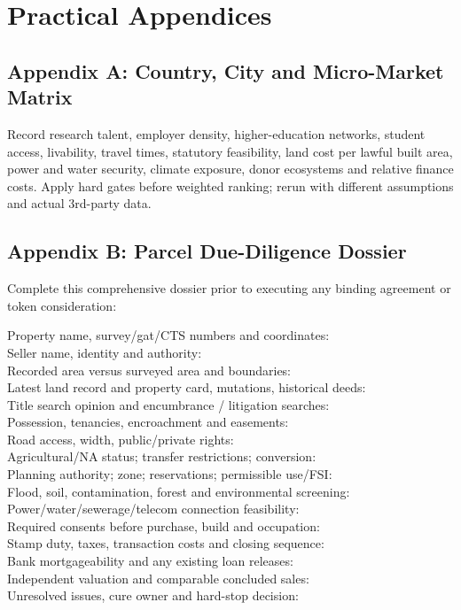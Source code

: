 \section{Practical Appendices}

\subsection{Appendix A: Country, City and Micro-Market Matrix}

Record research talent, employer density, higher-education networks, student access, livability, travel times, statutory feasibility, land cost per lawful built area, power and water security, climate exposure, donor ecosystems and relative finance costs. Apply hard gates before weighted ranking; rerun with different assumptions and actual 3rd-party data.

\subsection{Appendix B: Parcel Due-Diligence Dossier}

Complete this comprehensive dossier prior to executing any binding agreement or token consideration:

\begin{tcolorbox}[colback=BayesCanvas,colframe=BayesDark,arc=1mm,title=\textbf{Appendix B: Parcel Due-Diligence Dossier}]
\scriptsize\ttfamily\raggedright
Property name, survey/gat/CTS numbers and coordinates:\\[2pt]
Seller name, identity and authority:\\[2pt]
Recorded area versus surveyed area and boundaries:\\[2pt]
Latest land record and property card, mutations, historical deeds:\\[2pt]
Title search opinion and encumbrance / litigation searches:\\[2pt]
Possession, tenancies, encroachment and easements:\\[2pt]
Road access, width, public/private rights:\\[2pt]
Agricultural/NA status; transfer restrictions; conversion:\\[2pt]
Planning authority; zone; reservations; permissible use/FSI:\\[2pt]
Flood, soil, contamination, forest and environmental screening:\\[2pt]
Power/water/sewerage/telecom connection feasibility:\\[2pt]
Required consents before purchase, build and occupation:\\[2pt]
Stamp duty, taxes, transaction costs and closing sequence:\\[2pt]
Bank mortgageability and any existing loan releases:\\[2pt]
Independent valuation and comparable concluded sales:\\[2pt]
Unresolved issues, cure owner and hard-stop decision:
\end{tcolorbox}

